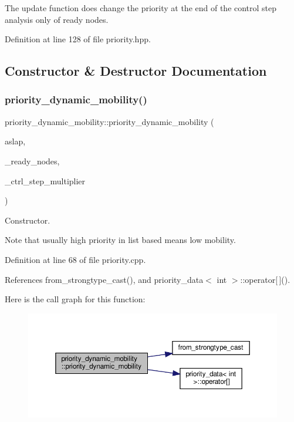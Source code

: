 The update function does change the priority at the end of the control step analysis only of ready nodes. 

Definition at line 128 of file priority.\+hpp.



\subsection{Constructor \& Destructor Documentation}
\mbox{\label{structpriority__dynamic__mobility_a9e5d4c33fc7de37bdd7e1fc8adc23eb8}} 
\subsubsection{\texorpdfstring{priority\+\_\+dynamic\+\_\+mobility()}{priority\_dynamic\_mobility()}}
{\footnotesize\ttfamily priority\+\_\+dynamic\+\_\+mobility\+::priority\+\_\+dynamic\+\_\+mobility (\begin{DoxyParamCaption}\item[{const \hyperlink{ASLAP_8hpp_afa0405547acd1806b9bd3e5d03beb045}{A\+S\+L\+A\+P\+Ref} \&}]{aslap,  }\item[{const \hyperlink{classOpVertexSet}{Op\+Vertex\+Set} \&}]{\+\_\+ready\+\_\+nodes,  }\item[{unsigned int}]{\+\_\+ctrl\+\_\+step\+\_\+multiplier }\end{DoxyParamCaption})}



Constructor. 

Note that usually high priority in list based means low mobility. 

Definition at line 68 of file priority.\+cpp.



References from\+\_\+strongtype\+\_\+cast(), and priority\+\_\+data$<$ int $>$\+::operator\mbox{[}$\,$\mbox{]}().

Here is the call graph for this function\+:
\nopagebreak
\begin{figure}[H]
\begin{center}
\leavevmode
\includegraphics[width=350pt]{da/dda/structpriority__dynamic__mobility_a9e5d4c33fc7de37bdd7e1fc8adc23eb8_cgraph}
\end{center}
\end{figure}


